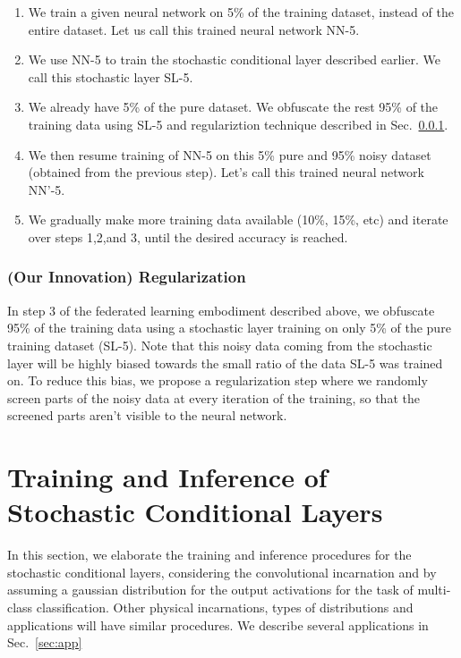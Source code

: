 \documentclass[12pt, letterpaper]{article}
\begin{document}
\begin{enumerate}
    \item We train a given neural network on 5\% of the training dataset, instead of the entire dataset. Let us call this trained neural network NN-5.
    \item We use NN-5 to train the stochastic conditional layer described earlier. We call this stochastic layer SL-5.
    \item We already have 5\% of the pure dataset. We obfuscate the rest 95\% of the training data using SL-5 and regulariztion technique described in Sec.~\ref{sec:reg}.  
    \item We then resume training of NN-5 on this 5\% pure and 95\% noisy dataset (obtained from the previous step). Let's call this trained neural network NN’-5.
    \item We gradually make more training data available (10\%, 15\%, etc) and iterate over steps 1,2,and 3, until the desired accuracy is reached.
\end{enumerate}

\subsubsection{(Our Innovation) Regularization}
\label{sec:reg}
In step 3 of the federated learning embodiment described above, we obfuscate 95\% of the training data using a stochastic layer training on only 5\% of the pure training dataset (SL-5). Note that this noisy data coming from the stochastic layer will be highly biased towards the small ratio of the data SL-5 was trained on. To reduce this bias, we propose a regularization step where we randomly screen parts of the noisy data at every iteration of the training, so that the screened parts aren't visible to the neural network. 

\section{Training and Inference of Stochastic Conditional Layers}
\label{sec:training_inf}
 
In this section, we elaborate the training and inference procedures for the stochastic conditional layers, considering the convolutional incarnation and by assuming a gaussian distribution for the output activations for the task of multi-class classification. Other physical incarnations, types of distributions and applications will have similar procedures. We describe several applications in Sec.~\ref{sec:app}
\end{document}
